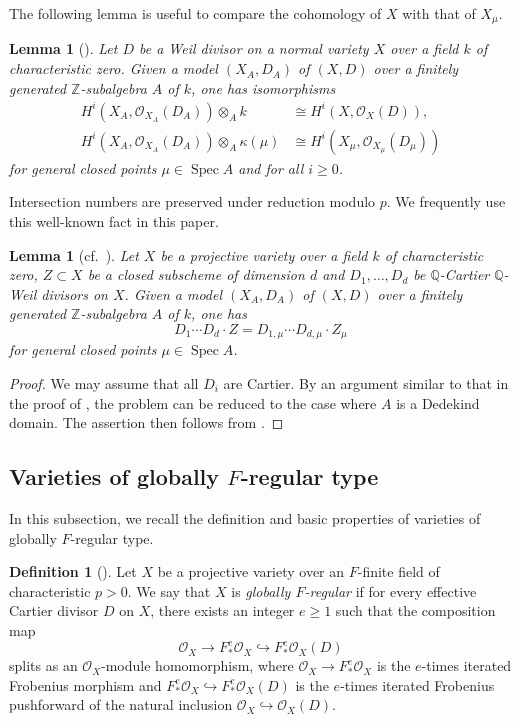 \documentclass[12pt]{amsart}
\def\ge{\geqslant}
\def\Spec{\operatorname{Spec}}
\newcommand{\Q}{\mathbb{Q}}
\newcommand{\Z}{\mathbb{Z}}
\newcommand{\sO}{\mathcal{O}}
\theoremstyle{plain}
\newtheorem{lem}[thm]{Lemma}
\theoremstyle{definition}
\newtheorem{defn}[thm]{Definition}
\theoremstyle{remark}
\newtheorem{defn and notation}[thm]{Definition and Notation}
\theoremstyle{plain}
\begin{document}
The following lemma is useful to compare the cohomology of $X$ with that of $X_{\mu}$. 
\begin{lem}[\textup{\cite[Lemma 4.1]{Hara98}}]\label{cohomology comparison}
Let $D$ be a Weil divisor on a normal variety $X$ over a field $k$ of characteristic zero. 
Given a model $(X_A, D_A)$ of $(X, D)$ over a finitely generated $\Z$-subalgebra $A$ of $k$, 
one has isomorphisms 
\begin{align*}
H^i(X_A, \sO_{X_A}(D_A)) \otimes_A k & \cong H^i(X, \sO_X(D)), \\
H^i(X_A, \sO_{X_A}(D_A)) \otimes_A \kappa(\mu) & \cong H^i(X_{\mu}, \sO_{X_{\mu}}(D_{\mu})) 
\end{align*}
for general closed points $\mu \in \Spec A$ and for all $i \ge 0$. 
\end{lem}

Intersection numbers are preserved under reduction modulo $p$. 
We frequently use this well-known fact in this paper. 
\begin{lem}[\textup{cf.~\cite[Example 20.3.3]{FultonBook}}]\label{intersection}
Let $X$ be a projective variety over a field $k$ of characteristic zero, $Z \subset X$ be a closed subscheme of dimension $d$ and $D_1, \dots, D_d$ be $\Q$-Cartier $\Q$-Weil divisors on $X$.  
Given a model $(X_A, D_A)$ of $(X, D)$ over a finitely generated $\Z$-subalgebra $A$ of $k$, one has 
\[
D_1 \cdots D_d \cdot Z=D_{1,\mu} \cdots D_{d, \mu} \cdot Z_{\mu}
\]
for general closed points $\mu \in \Spec A$. 
\end{lem}
\begin{proof}
We may assume that all $D_i$ are Cartier. 
By an argument similar to that in the proof of \cite[Proposition 5.3]{Mustata-Srinivas11}, the problem can be reduced to the case where $A$ is a Dedekind domain. 
The assertion then follows from \cite[Example 20.3.3]{FultonBook}. 
\end{proof}

\subsection{Varieties of globally $F$-regular type}
In this subsection, we recall the definition and basic properties of varieties of globally $F$-regular type. 

\begin{defn}[\cite{Smith00}]
Let $X$ be a projective variety over an $F$-finite field of characteristic $p>0$. We say that $X$ is \textit{globally $F$-regular} if for every effective Cartier divisor $D$ on $X$, there exists an integer $e \ge 1$ such that the composition map 
\[
\sO_X \to F^e_*\sO_X \hookrightarrow F^e_*\sO_X(D)
\]
splits as an $\sO_X$-module homomorphism, where $\sO_X \to F^e_*\sO_X$ is the $e$-times iterated Frobenius morphism and $F^e_*\sO_X \hookrightarrow F^e_*\sO_X(D)$ is the $e$-times iterated Frobenius pushforward of the natural inclusion $\sO_X \hookrightarrow \sO_X(D)$. 
\end{defn}
\end{document}
